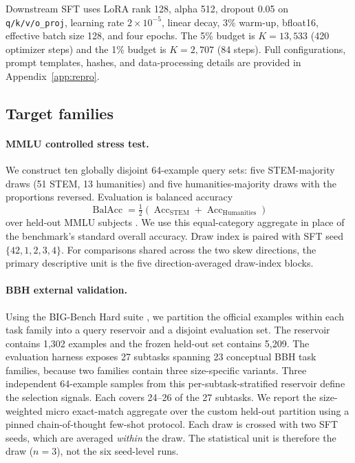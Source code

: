 \documentclass{article}
\begin{document}
Downstream SFT uses LoRA rank 128, alpha 512, dropout 0.05 on
\texttt{q/k/v/o\_proj}, learning rate $2\times10^{-5}$, linear decay, 3\%
warm-up, bfloat16, effective batch size 128, and four epochs. The 5\% budget is
$K=13{,}533$ (420 optimizer steps) and the 1\% budget is $K=2{,}707$ (84
steps). Full configurations, prompt templates, hashes, and data-processing
details are provided in Appendix~\ref{app:repro}.

\subsection{Target families}

\paragraph{MMLU controlled stress test.}
We construct ten globally disjoint 64-example query sets:
five STEM-majority draws (51 STEM, 13 humanities) and five
humanities-majority draws with the proportions reversed. Evaluation is balanced
accuracy
\[
\operatorname{BalAcc}
=\tfrac12(\operatorname{Acc}_{\mathrm{STEM}}
          +\operatorname{Acc}_{\mathrm{Humanities}})
\]
over held-out MMLU subjects \citep{hendrycks2021mmlu}. We use this
equal-category aggregate in place of the benchmark's standard overall
accuracy. Draw index is paired with SFT seed $\{42,1,2,3,4\}$. For
comparisons shared across the two skew directions, the primary descriptive
unit is the five direction-averaged draw-index blocks.

\paragraph{BBH external validation.}
Using the BIG-Bench Hard suite \citep{suzgun2023bbh}, we partition the official
examples within each task family into a query reservoir and a disjoint
evaluation set. The reservoir contains 1,302 examples and the frozen held-out
set contains 5,209. The evaluation harness exposes 27 subtasks spanning
23 conceptual BBH task families, because two families contain three
size-specific variants. Three independent 64-example samples from this
per-subtask-stratified reservoir define the selection signals. Each covers
24--26 of the 27 subtasks. We report the size-weighted micro exact-match
aggregate over the custom held-out partition using a pinned chain-of-thought
few-shot protocol. Each draw is crossed with two SFT seeds, which are averaged
\emph{within} the draw. The statistical unit is therefore the draw ($n=3$),
not the six seed-level runs.
\end{document}
